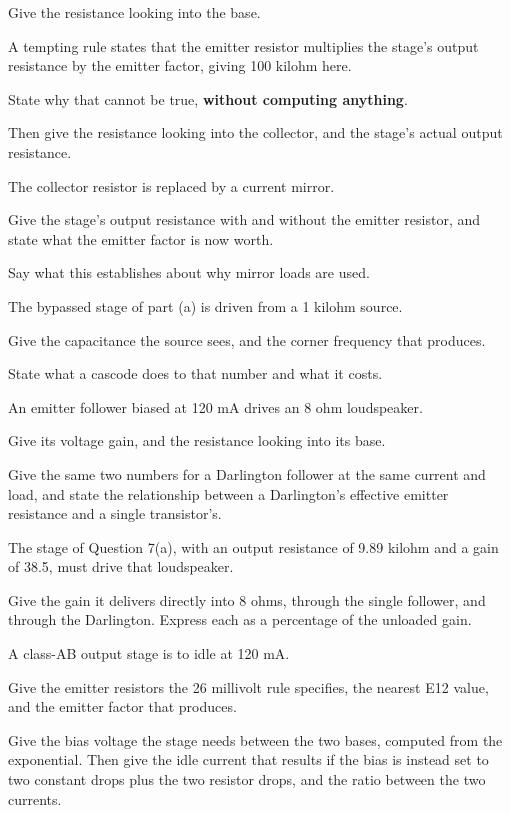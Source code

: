 Give the resistance looking into the base.

 A tempting rule states that the emitter resistor multiplies the stage's output resistance by the emitter factor, giving 100 kilohm here.

State why that cannot be true, \textbf{without computing anything}.

Then give the resistance looking into the collector, and the stage's actual output resistance.

 The collector resistor is replaced by a current mirror.

Give the stage's output resistance with and without the emitter resistor, and state what the emitter factor is now worth.

Say what this establishes about why mirror loads are used.

 The bypassed stage of part (a) is driven from a 1 kilohm source.

Give the capacitance the source sees, and the corner frequency that produces.

State what a cascode does to that number and what it costs.

\label{exa:q:8}

 An emitter follower biased at 120 mA drives an 8 ohm loudspeaker.

Give its voltage gain, and the resistance looking into its base.

Give the same two numbers for a Darlington follower at the same current and load, and state the relationship between a Darlington's effective emitter resistance and a single transistor's.

 The stage of Question 7(a), with an output resistance of 9.89 kilohm and a gain of 38.5, must drive that loudspeaker.

Give the gain it delivers directly into 8 ohms, through the single follower, and through the Darlington. Express each as a percentage of the unloaded gain.

 A class-AB output stage is to idle at 120 mA.

Give the emitter resistors the 26 millivolt rule specifies, the nearest E12 value, and the emitter factor that produces.

Give the bias voltage the stage needs between the two bases, computed from the exponential. Then give the idle current that results if the bias is instead set to two constant drops plus the two resistor drops, and the ratio between the two currents.

